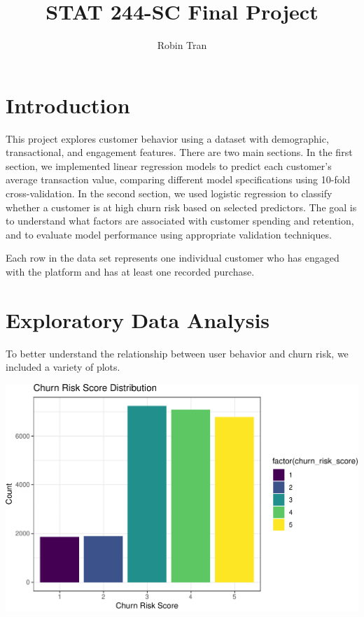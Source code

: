 \documentclass[
  letterpaper,
  DIV=11,
  numbers=noendperiod]{scrartcl}
\title{STAT 244-SC Final Project}
\author{Robin Tran}
\date{}
\begin{document}
\maketitle


\section{Introduction}\label{introduction}

This project explores customer behavior using a dataset with
demographic, transactional, and engagement features. There are two main
sections. In the first section, we implemented linear regression models
to predict each customer's average transaction value, comparing
different model specifications using 10-fold cross-validation. In the
second section, we used logistic regression to classify whether a
customer is at high churn risk based on selected predictors. The goal is
to understand what factors are associated with customer spending and
retention, and to evaluate model performance using appropriate
validation techniques.

Each row in the data set represents one individual customer who has
engaged with the platform and has at least one recorded purchase.

\section{Exploratory Data Analysis}\label{exploratory-data-analysis}

To better understand the relationship between user behavior and churn
risk, we included a variety of plots.

\begin{center}
\includegraphics{FPCP4_files/figure-pdf/unnamed-chunk-13-1.pdf}
\end{center}
\end{document}
